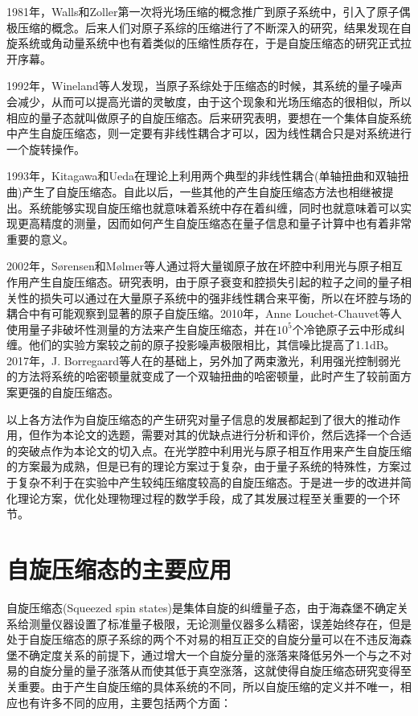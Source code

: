 1981年，Walls和Zoller第一次将光场压缩的概念推广到原子系统中\cite{PhysRevLett.47.709}，引入了原子偶极压缩的概念。后来人们对原子系综的压缩进行了不断深入的研究，结果发现在自旋系统或角动量系统中也有着类似的压缩性质存在，于是自旋压缩态的研究正式拉开序幕。

1992年，Wineland等人\cite{PRA1992Wineland}发现，当原子系综处于压缩态的时候，其系统的量子噪声会减少，从而可以提高光谱的灵敏度，由于这个现象和光场压缩态的很相似，所以相应的量子态就叫做原子的自旋压缩态。后来研究表明，要想在一个集体自旋系统中产生自旋压缩态，则一定要有非线性耦合才可以，因为线性耦合只是对系统进行一个旋转操作。

1993年，Kitagawa和Ueda\cite{PRA1993Kitagawa}在理论上利用两个典型的非线性耦合(单轴扭曲和双轴扭曲)产生了自旋压缩态。自此以后，一些其他的产生自旋压缩态方法也相继被提出。系统能够实现自旋压缩也就意味着系统中存在着纠缠，同时也就意味着可以实现更高精度的测量，因而如何产生自旋压缩态在量子信息和量子计算中也有着非常重要的意义。

2002年，S\o{}rensen和M\o{}lmer等人\cite{PRA2002SS}通过将大量铷原子放在坏腔中利用光与原子相互作用产生自旋压缩态。研究表明，由于原子衰变和腔损失引起的粒子之间的量子相关性的损失可以通过在大量原子系统中的强非线性耦合来平衡，所以在坏腔与场的耦合中有可能观察到显著的原子自旋压缩。2010年，Anne Louchet-Chauvet等人\cite{LCA2010}使用量子非破坏性测量的方法来产生自旋压缩态，并在$10^5$个冷铯原子云中形成纠缠。他们的实验方案较之前的原子投影噪声极限相比，其信噪比提高了1.1dB。2017年，J. Borregaard等人\cite{NJP2017J-Borregaard}在\cite{PRA2002SS}的基础上，另外加了两束激光，利用强光控制弱光的方法将系统的哈密顿量就变成了一个双轴扭曲的哈密顿量，此时产生了较前面方案更强的自旋压缩态。

以上各方法作为自旋压缩态的产生研究对量子信息的发展都起到了很大的推动作用，但作为本论文的选题，需要对其的优缺点进行分析和评价，然后选择一个合适的突破点作为本论文的切入点。在光学腔中利用光与原子相互作用来产生自旋压缩的方案最为成熟，但是已有的理论方案过于复杂，由于量子系统的特殊性，方案过于复杂不利于在实验中产生较纯压缩度较高的自旋压缩态。于是进一步的改进并简化理论方案，优化处理物理过程的数学手段，成了其发展过程至关重要的一个环节。

\vbox{}
\section{自旋压缩态的主要应用}\label{section13}
\vbox{}
自旋压缩态(Squeezed spin states)是集体自旋的纠缠量子态，由于海森堡不确定关系给测量仪器设置了标准量子极限，无论测量仪器多么精密，误差始终存在，但是处于自旋压缩态的原子系综的两个不对易的相互正交的自旋分量可以在不违反海森堡不确定度关系的前提下，通过增大一个自旋分量的涨落来降低另外一个与之不对易的自旋分量的量子涨落从而使其低于真空涨落，这就使得自旋压缩态研究变得至关重要。由于产生自旋压缩的具体系统的不同，所以自旋压缩的定义并不唯一，相应也有许多不同的应用，主要包括两个方面：

